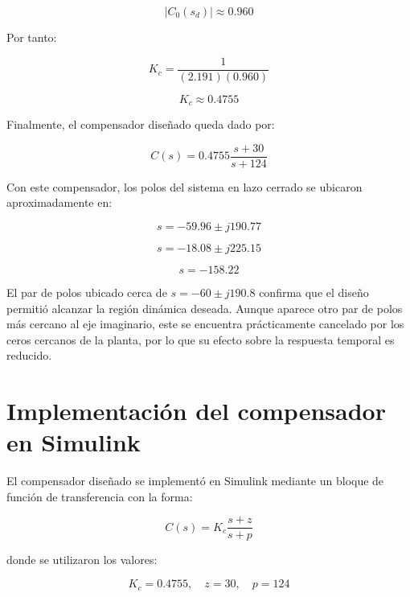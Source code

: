 \documentclass[journal]{IEEEtran}
\begin{document}
\begin{equation}
|C_0(s_d)|\approx0.960
\end{equation}

Por tanto:

\begin{equation}
K_c=\frac{1}{(2.191)(0.960)}
\end{equation}

\begin{equation}
K_c\approx0.4755
\end{equation}

Finalmente, el compensador diseñado queda dado por:

\begin{equation}
C(s)=0.4755\frac{s+30}{s+124}
\end{equation}

Con este compensador, los polos del sistema en lazo cerrado se ubicaron aproximadamente en:

\begin{equation}
s=-59.96 \pm j190.77
\end{equation}

\begin{equation}
s=-18.08 \pm j225.15
\end{equation}

\begin{equation}
s=-158.22
\end{equation}

El par de polos ubicado cerca de $s=-60\pm j190.8$ confirma que el diseño permitió alcanzar la región dinámica deseada. Aunque aparece otro par de polos más cercano al eje imaginario, este se encuentra prácticamente cancelado por los ceros cercanos de la planta, por lo que su efecto sobre la respuesta temporal es reducido.

\section{Implementación del compensador en Simulink}

El compensador diseñado se implementó en Simulink mediante un bloque de función de transferencia con la forma:

\begin{equation}
C(s)=K_c\frac{s+z}{s+p}
\end{equation}

donde se utilizaron los valores:

\begin{equation}
K_c=0.4755, \quad z=30, \quad p=124
\end{equation}
\end{document}
